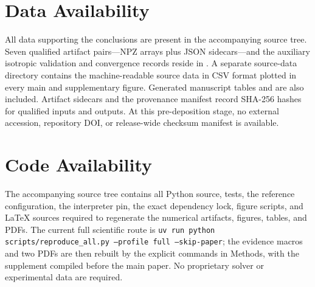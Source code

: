 \section*{Data Availability}

All data supporting the conclusions are present in the accompanying source
tree.  Seven qualified artifact pairs---NPZ arrays plus JSON sidecars---and
the auxiliary isotropic validation and convergence records reside in
.  A separate source-data directory contains the
machine-readable source data in CSV format plotted in every main and
supplementary figure.  Generated manuscript
tables and  are also included.  Artifact
sidecars and the provenance manifest record SHA-256 hashes for qualified inputs
and outputs.  At this pre-deposition stage, no external accession, repository
DOI, or release-wide checksum manifest is available.

\section*{Code Availability}

The accompanying source tree contains all Python source, tests, the reference
configuration, the interpreter pin, the exact dependency lock, figure scripts,
and LaTeX sources required to regenerate the numerical artifacts, figures,
tables, and PDFs.  The current full scientific route is
\texttt{uv run python scripts/reproduce\_all.py --profile full --skip-paper};
the evidence macros and two PDFs are then rebuilt by the explicit commands in
Methods, with the supplement compiled before the main paper.  No proprietary
solver or experimental data are required.
